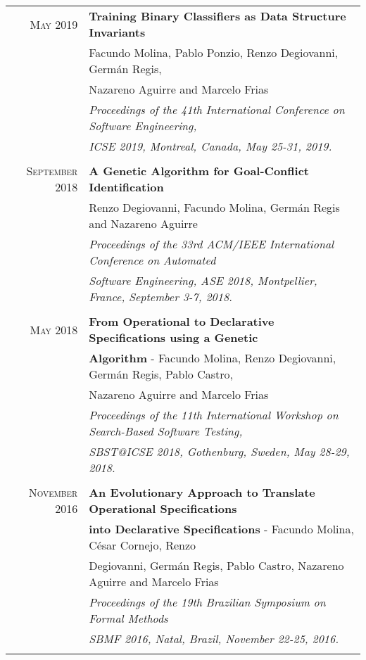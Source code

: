 \documentclass[a4paper,10pt]{article} %
\begin{document}
\begin{longtable}{rl}
\textsc{May} 2019  & \textbf{Training Binary Classifiers as Data Structure Invariants} \\ 
& Facundo Molina, Pablo Ponzio, Renzo Degiovanni, Germán Regis, \\ 
& Nazareno Aguirre and Marcelo Frias \\
& \textit{Proceedings of the 41th International Conference on Software Engineering,} \\
& \textit{ICSE 2019, Montreal, Canada, May 25-31, 2019.} \\ & \\

\textsc{September} 2018  & \textbf{A Genetic Algorithm for Goal-Conflict Identification} \\ 
& Renzo Degiovanni, Facundo Molina, Germán Regis and Nazareno Aguirre \\
& \textit{Proceedings of the 33rd ACM/IEEE International Conference on Automated } \\
& \textit{Software Engineering, ASE 2018, Montpellier, France, September 3-7, 2018.} \\ & \\

\textsc{May} 2018  & \textbf{From Operational to Declarative Specifications using a Genetic} \\ & \textbf{Algorithm} - Facundo Molina, Renzo Degiovanni, Germán Regis, Pablo Castro,\\
& Nazareno Aguirre and Marcelo Frias \\
& \textit{Proceedings of the 11th International Workshop on Search-Based Software Testing,} \\
& \textit{SBST@ICSE 2018, Gothenburg, Sweden, May 28-29, 2018.} \\ & \\

\textsc{November} 2016 & \textbf{An Evolutionary Approach to Translate Operational Specifications} \\ & \textbf{into Declarative Specifications} - Facundo Molina, César Cornejo, Renzo \\
& Degiovanni, Germán Regis, Pablo Castro, Nazareno Aguirre and Marcelo Frias \\
& \textit{Proceedings of the 19th Brazilian Symposium on Formal Methods} \\ 
& \textit{SBMF 2016, Natal, Brazil, November 22-25, 2016.} \\ & \\

\end{longtable}
\end{document}
